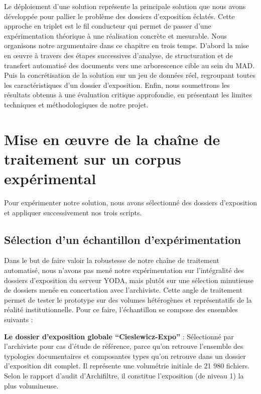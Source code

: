 Le déploiement d'une solution représente la principale solution que nous avons développée pour pallier le problème des dossiers d'exposition éclatés. Cette approche en triplet est le fil conducteur qui permet de passer d'une expérimentation théorique à une réalisation concrète et mesurable. Nous organisons notre argumentaire dans ce chapitre en trois temps. D'abord la mise en œuvre à travers des étapes successives d'analyse, de structuration et de transfert automatisé des documents vers une arborescence cible au sein du MAD. Puis la concrétisation de la solution sur un jeu de données réel, regroupant toutes les caractéristiques d'un dossier d'exposition. Enfin,  nous soumettrons les résultats obtenus à une évaluation critique approfondie, en présentant les limites techniques et méthodologiques de notre projet.


\section{Mise en œuvre de la chaîne de traitement sur un corpus expérimental}

Pour expérimenter notre solution, nous avons sélectionné des dossiers d'exposition et appliquer successivement nos trois scripts.



\subsection*{Sélection d’un échantillon d’expérimentation}


Dans le but de faire valoir la robustesse de notre chaîne de traitement automatisé, nous n'avons pas mené notre expérimentation sur l'intégralité des dossiers d'exposition du serveur YODA, mais plutôt sur une sélection minutieuse de dossiers menée en concertation avec l'archiviste. Cette angle de traitement permet de tester le prototype sur des volumes hétérogènes et représentatifs de la réalité institutionnelle. Pour ce faire, l'échantillon se compose des ensembles suivants : 

\textbf{Le dossier d'exposition globale \enquote{Cieslewicz-Expo}} : Sélectionné par l'archiviste pour cas d'étude de référence, parce qu'on retrouve l'ensemble des typologies documentaires et composantes types qu'on retrouve dans un dossier d'exposition dit complet. Il représente une volumétrie initiale de 21 980 fichiers. Selon le rapport d'audit d'Archifiltre, il constitue l'exposition (de niveau 1) la plus volumineuse.

